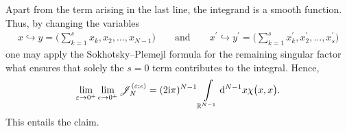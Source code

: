 \documentclass[pdftex]{sigma}%
\numberwithin{equation}{section}
\begin{document}
Apart from the term arising in the last line, the integrand is a smooth function. Thus, by changing the variables
\begin{gather*}
x\hookrightarrow y=\bigg( \sum_{k=1}^{s}x_k ,x_2,\dots, x_{N-1} \bigg) \qquad \text{and} \qquad
x^{\prime}\hookrightarrow y^{\prime}=\bigg( \sum_{k=1}^{s} x_k^{\prime},x_2^{\prime},\dots, x_{s}^{\prime} \bigg)
\end{gather*}
one may apply the Sokhotsky--Plemejl formula for the remaining singular factor what ensures that solely the $s=0$ term contributes to the
integral. Hence,{\samepage
\begin{gather*}
 \lim_{\varepsilon\rightarrow 0^+} \lim_{\epsilon \rightarrow 0^+ } \mathscr{J}_N^{(\varepsilon;\epsilon)} = (2 {\rm i}\pi)^{N-1}
 \int\limits_{\mathbb{R}^{N-1}}{} {\rm d}^{N-1}x \chi\big( x, x\big) .
\end{gather*}
This entails the claim.}
\end{document}
